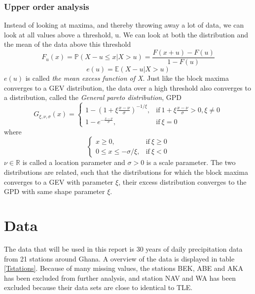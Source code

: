 \documentclass{article}
\begin{document}
	\subsubsection{Upper order analysis}
	Instead of looking at maxima, and thereby throwing away a lot of data, we can look at all values above a threshold, u. We can look at both the distribution and the mean of the data above this threshold
	\begin{equation*}
	F_u(x) = \mathbb{P}(X - u \leq x | X > u) = \frac{F(x + u) - F(u)}{1 - F(u)}
	\end{equation*}
	\begin{equation*}
	e(u) = \mathbb{E}(X - u | X > u)
	\end{equation*}
	$e(u)$ is called \textit{the mean excess function of X}. Just like the block maxima converges to a GEV distribution, the data over a high threshold also converges to a distribution, called the \textit{General pareto distribution}, GPD
	\begin{equation*}
	G_{\xi, \nu, \sigma}(x) =
	\begin{cases}
	1-(1+\xi \frac{x-\nu}{\sigma})^{-1/\xi}, & \text{if} \ 1+\xi \frac{x-\nu}{\sigma} > 0, \xi \neq 0 \\
	1- e^{-\frac{x-\nu}{\sigma}}, & \text{if} \  \xi = 0
	\end{cases}
	\end{equation*}
	where
	\begin{equation*}
	\begin{cases}
	x \geq 0, & \text{if} \ \xi \geq 0 \\
	0 \leq x \leq -\sigma/ \xi, & \text{if} \ \xi < 0
	\end{cases}
	\end{equation*}
	$\nu \in \mathbb{R}$ is called a location parameter and $\sigma>0$ is a scale parameter. The two distributions are related, such that the distributions for which the block maxima converges to a GEV with parameter $\xi$, their excess distribution converges to the GPD with same shape parameter $\xi$. 
	
	\section{Data}
	The data that will be used in this report is 30 years of daily precipitation data from 21 stations around Ghana. A overview of the data is displayed in table \ref{Tstations}. Because of many missing values, the stations BEK, ABE and AKA has been excluded from further analysis, and station NAV and WA has been excluded because their data sets are close to identical to TLE.
\end{document}
